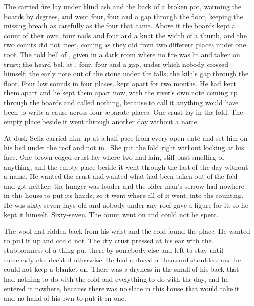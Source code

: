 The carried fire lay under blind ash and the back of a broken pot, warming the boards by degrees, and  went four, four and a gap through the floor, keeping the missing breath as carefully as the four that came. Above it the boards kept a count of their own, four nails and four and a knot the width of a thumb, and the two counts did not meet, coming as they did from two different places under one roof. The told bell of , given in a dark room where no fire was lit and taken on trust; the heard bell at , four, four and a gap, under which nobody crossed himself; the early note out of the stone under the falls; the kiln's gap through the floor. Four low sounds in four places, kept apart for two months. He had kept them apart and he kept them apart now, with the river's own note coming up through the boards and called nothing, because to call it anything would have been to write a cause across four separate places. One crust lay in the fold. The empty place beside it went through another day without a name.

\scenebreak

At dusk Sella carried him up  at a half-pace from every open slate and set him on his bed under the roof and not in . She put the fold right without looking at his face. One brown-edged crust lay where two had lain, stiff past smelling of anything, and the empty place beside it went through the last of the day without a name. He wanted the crust and wanted what had been taken out of the fold and got neither; the hunger was louder and the older man's sorrow had nowhere in this house to put its hands, so it went where all of it went, into the counting. He was sixty-seven days old and nobody under any roof gave a figure for it, so he kept it himself. Sixty-seven. The count went on and could not be spent.

The wool had ridden back from his wrist and the cold found the place. He wanted to pull it up and could not. The dry crust pressed at his ear with the stubbornness of a thing put there by somebody else and left to stay until somebody else decided otherwise. He had reduced a thousand shoulders and he could not keep a blanket on. There was a dryness in the small of his back that had nothing to do with the cold and everything to do with the day, and he entered it nowhere, because there was no slate in this house that would take it and no hand of his own to put it on one.

